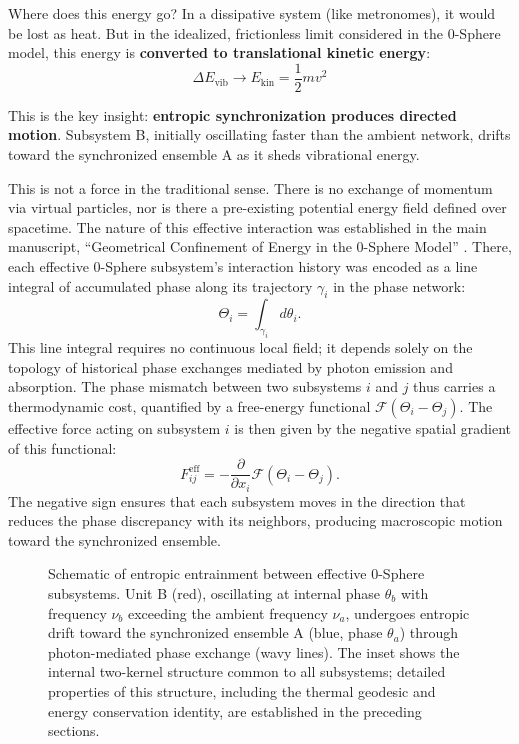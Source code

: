 \documentclass[12pt,letterpaper]{article}
\begin{document}
Where does this energy go? In a dissipative system (like metronomes), it would be lost as heat. But in the idealized, frictionless limit considered in the 0-Sphere model, this energy is \textbf{converted to translational kinetic energy}:
\begin{equation}
\Delta E_\text{vib} \rightarrow E_\text{kin} = \frac{1}{2} m v^2
\end{equation}

This is the key insight: \textbf{entropic synchronization produces directed motion}. Subsystem B, initially oscillating faster than the ambient network, drifts toward the synchronized ensemble A as it sheds vibrational energy.

This is not a force in the traditional sense. There is no exchange of momentum via virtual particles, nor is there a pre-existing potential energy field defined over spacetime. The nature of this effective interaction was established in the main manuscript, ``Geometrical Confinement of Energy in the 0-Sphere Model'' \cite{Hanamura2026geometrical}. There, each effective 0-Sphere subsystem's interaction history was encoded as a line integral of accumulated phase along its trajectory $\gamma_i$ in the phase network:
\[
  \Theta_i = \int_{\gamma_i} d\theta_i.
\]
This line integral requires no continuous local field; it depends solely on the topology of historical phase exchanges mediated by photon emission and absorption. The phase mismatch between two subsystems $i$ and $j$ thus carries a thermodynamic cost, quantified by a free-energy functional $\mathcal{F}(\Theta_i - \Theta_j)$. The effective force acting on subsystem $i$ is then given by the negative spatial gradient of this functional:
\begin{equation}
  F^{\mathrm{eff}}_{ij} = -\frac{\partial}{\partial x_i}\mathcal{F}\!\left(\Theta_i - \Theta_j\right).
\end{equation}
The negative sign ensures that each subsystem moves in the direction that reduces the phase discrepancy with its neighbors, producing macroscopic motion toward the synchronized ensemble.


\begin{figure}[t!]
\centering

\caption{\justifying Schematic of entropic entrainment between effective 0-Sphere subsystems. Unit B (red), oscillating at internal phase $\theta_b$ with frequency $\nu_b$ exceeding the ambient frequency $\nu_a$, undergoes entropic drift toward the synchronized ensemble A (blue, phase $\theta_a$) through photon-mediated phase exchange (wavy lines). The inset shows the internal two-kernel structure common to all subsystems; detailed properties of this structure, including the thermal geodesic and energy conservation identity, are established in the preceding sections.}
\label{fig:entrainment}
\end{figure}
\end{document}
